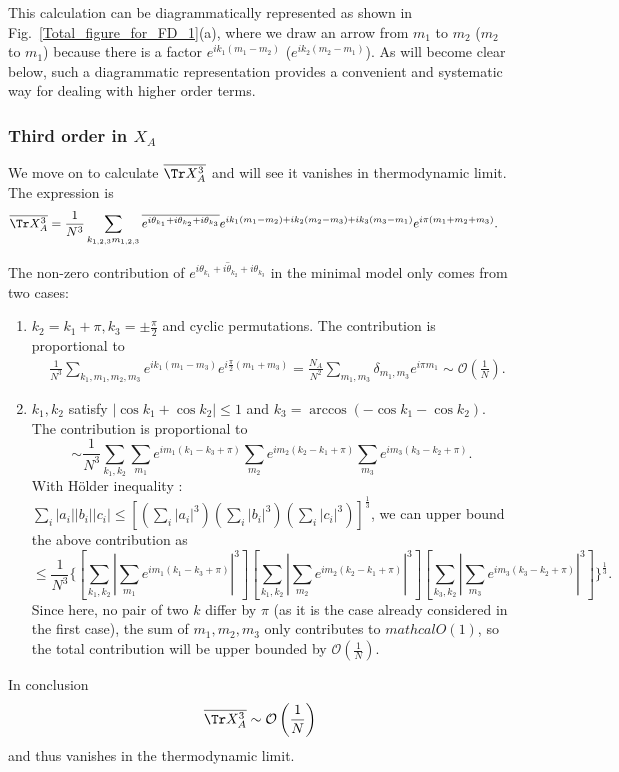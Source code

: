 This calculation can be diagrammatically represented as shown in Fig.~\ref{Total_figure_for_FD_1}(a), where we draw an arrow from $m_1$ to $m_2$ ($m_2$ to $m_1$) because there is a factor $e^{ik_1(m_1-m_2)}$ ($e^{ik_2(m_2-m_1)}$). As will become clear below, such a diagrammatic representation provides a convenient and systematic way for dealing with higher order terms.

\subsubsection{Third order in $X_{A}$}
We move on to calculate $\overline{\Tr X_{A}^{3}}$ and will %
see %
it vanishes in thermodynamic limit. The expression is 
\begin{align*}
\overline{\Tr X_{A}^{3}} & =\frac{1}{N^{3}}\sum_{k_{1,2,3}m_{1,2,3}}\overline{e^{i\theta_{k_{1}}+i\theta_{k_{2}}+i\theta_{k_{3}}}}e^{ik_{1}(m_{1}-m_{2})+ik_{2}(m_{2}-m_{3})+ik_{3}(m_{3}-m_{1})}e^{i\pi(m_{1}+m_{2}+m_{3})}.
\end{align*}

The non-zero contribution of $\overline{e^{i\theta_{k_{1}}+i\theta_{k_{2}}+i\theta_{k_{3}}}}$
in the minimal model only comes from two cases:
\begin{enumerate}
\item $k_{2}=k_{1}+\pi,k_{3}=\pm\frac{\pi}{2}$ and cyclic permutations.
The contribution is proportional to 
\begin{align*}
 & \frac{1}{N^{3}}\sum_{k_{1},m_{1},m_{2},m_{3}}e^{ik_{1}(m_{1}-m_{3})}e^{i\frac{\pi}{2}(m_{1}+m_{3})} =\frac{N_{A}}{N^{2}}\sum_{m_{1},m_{3}}\delta_{m_{1},m_{3}}e^{i\pi m_{1}}\sim \mathcal{O}\left(\frac{1}{N}\right).
\end{align*}
\item $k_{1},k_{2}$ satisfy $|\cos k_{1}+\cos k_{2}|\leq1$ and $k_{3}=\arccos(-\cos k_{1}-\cos k_{2})$.
The contribution is proportional to
\[
\sim\frac{1}{N^{3}}\sum_{k_{1},k_{2}}\sum_{m_{1}}e^{im_{1}(k_{1}-k_{3}+\pi)}\sum_{m_{2}}e^{im_{2}(k_{2}-k_{1}+\pi)}\sum_{m_{3}}e^{im_{3}(k_{3}-k_{2}+\pi)}.
\]
With H\"older inequality \citep{hardy1988inequalities}: $\sum_{i}|a_{i}||b_{i}||c_{i}|\leq[(\sum_{i}|a_{i}|^{3})(\sum_{i}|b_{i}|^{3})(\sum_{i}|c_{i}|^{3})]^{\frac{1}{3}}$,
we can upper bound the above contribution as 
\[
\leq\frac{1}{N^{3}}\{[\sum_{k_{1},k_{2}}|\sum_{m_{1}}e^{im_{1}(k_{1}-k_{3}+\pi)}|^{3}][\sum_{k_{1},k_{2}}|\sum_{m_{2}}e^{im_{2}(k_{2}-k_{1}+\pi)}|^{3}][\sum_{k_{3},k_{2}}|\sum_{m_{3}}e^{im_{3}(k_{3}-k_{2}+\pi)}|^{3}]\}^{\frac{1}{3}}.
\]
Since here, no pair of two $k$ differ by $\pi$ (as it is the case
already considered in the first case), the sum of $m_{1},m_{2},m_{3}$
only contributes to $mathcal{O}(1)$, so the total contribution will be upper
bounded by $\mathcal{O}\left(\frac{1}{N}\right)$.
\end{enumerate}
In conclusion
\[
\overline{\Tr X_{A}^{3}}\sim \mathcal{O}\left(\frac{1}{N}\right)
\]
and thus vanishes in the thermodynamic limit. 


